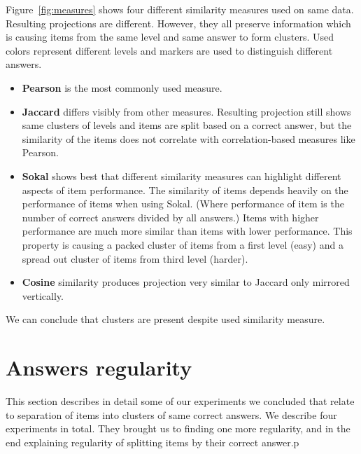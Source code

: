 \documentclass[
  print, %
  table,   %
  nolof,     %
  nolot,     %
  nocover,
  color,
  final,
]{fithesis3}
\begin{document}

Figure~\ref{fig:measures} shows four different similarity measures used on same data. Resulting projections are different. However, they all preserve information which is causing items from the same level and same answer to form clusters. Used colors represent different levels and markers are used to distinguish different answers.


\begin{itemize}
\item
  \textbf{Pearson} is the most commonly used measure.

\item
  \textbf{Jaccard} differs visibly from other measures. Resulting projection still shows same clusters of levels and items are split based on a correct answer, but the similarity of the items does not correlate with correlation-based measures like Pearson.

\item
  \textbf{Sokal} shows best that different similarity measures can highlight different aspects of item performance. The similarity of items depends heavily on the performance of items when using Sokal. (Where performance of item is the number of correct answers divided by all answers.) Items with higher performance are much more similar than items with lower performance. This property is causing a packed cluster of items from a first level (easy) and a spread out cluster of items from third level (harder).

\item
  \textbf{Cosine} similarity produces projection very similar to Jaccard only mirrored vertically.
\end{itemize}

We can conclude that clusters are present despite used similarity measure.


\section{Answers regularity}\label{evaulation-answers-regularity}

This section describes in detail some of our experiments we concluded that relate to separation of items into clusters of same correct answers. We describe four experiments in total. They brought us to finding one more regularity, and in the end explaining regularity of splitting items by their correct answer.p
\end{document}
